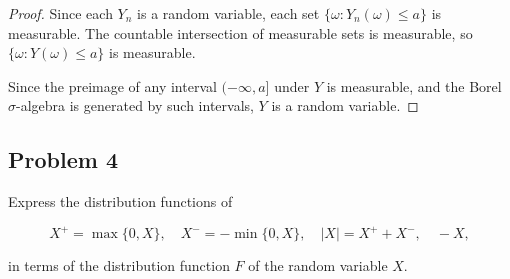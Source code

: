 \documentclass[letterpaper, 11pt]{article}
\newcommand{\1}{\mathds{1}}	%
\theoremstyle{definition}
\begin{document}
\begin{proof}
Since each $Y_n$ is a random variable, each set $\{\omega: Y_n(\omega) \leq a\}$ is measurable. The countable intersection of measurable sets is measurable, so $\{\omega: Y(\omega) \leq a\}$ is measurable.

Since the preimage of any interval $(-\infty, a]$ under $Y$ is measurable, and the Borel $\sigma$-algebra is generated by such intervals, $Y$ is a random variable.
    \end{proof}
\subsection*{Problem 4}
Express the distribution functions of

$$X^{+} = \max\{0, X\}, \quad X^{-} = -\min\{0, X\}, \quad |X| = X^{+} + X^{-}, \quad -X,$$

in terms of the distribution function $F$ of the random variable $X$.
\end{document}
